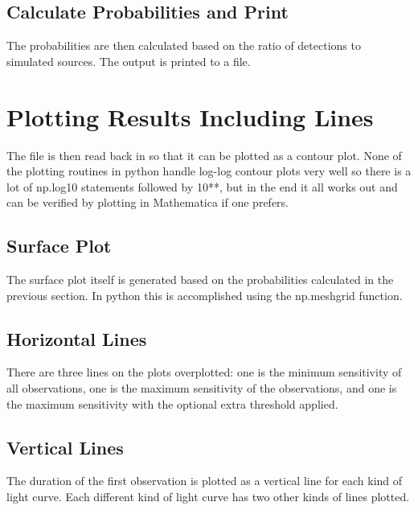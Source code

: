 \documentclass{article}
\begin{document}
\subsection{Calculate Probabilities and Print}
The probabilities are then calculated based on the ratio of detections to simulated sources. The output is printed to a file.

\section{Plotting Results Including Lines}
The file is then read back in so that it can be plotted as a contour plot. None of the plotting routines in python handle log-log contour plots very well so there is a lot of np.log10 statements followed by 10**, but in the end it all works out and can be verified by plotting in Mathematica if one prefers. 
\subsection{Surface Plot}
The surface plot itself is generated based on the probabilities calculated in the previous section. In python this is accomplished using the np.meshgrid function. 

\subsection{Horizontal Lines}
There are three lines on the plots overplotted: one is the minimum sensitivity of all observations, one is the maximum sensitivity of the observations, and one is the maximum sensitivity with the optional extra threshold applied.

\subsection{Vertical Lines}
The duration of the first observation is plotted as a vertical line for each kind of light curve. Each different kind of light curve has two other kinds of lines plotted.
\end{document}
